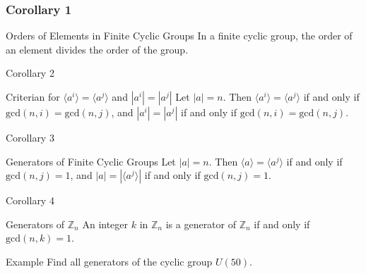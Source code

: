 \documentclass{beamer}
\begin{document}
    \begin{frame}
        \frametitle{Corollary 1}
        \begin{block}{Orders of Elements in Finite Cyclic Groups}
        In a finite cyclic group, the order of an element divides the order of the group. 
        \end{block}
    \end{frame}

    \begin{frame}{Corollary 2}
    \begin{block}{Criterian for \(\langle a^i\rangle = \langle a^j \rangle\) and \(|a^i|=|a^j|\)}   
    Let \(|a|=n\). Then \(\langle a^i \rangle = \langle a^j \rangle\) if and only if \(\text{gcd}(n,i) =\text{gcd}(n,j)\), and \(|a^i|=|a^j|\) if and only if \(\text{gcd}(n,i)=\text{gcd}(n,j)\).
    \end{block}
    \end{frame}

    \begin{frame}{Corollary 3}
    \begin{block}{Generators of Finite Cyclic Groups}
    Let \(|a|=n\). Then \(\langle a\rangle = \langle a^j\rangle\) if and only if \(\text{gcd}(n,j)=1\), and \(|a|=|\langle a^j\rangle|\) if and only if \(\text{gcd}(n,j)=1\).
    \end{block}
    \end{frame}

    \begin{frame}{Corollary 4}
    \begin{block}{Generators of \(\mathbb{Z}_n\)} 
    An integer \(k\) in \(\mathbb{Z}_n\) is a generator of \(\mathbb{Z}_n\) if and only if \(\text{gcd}(n,k)=1\).
    \end{block}
    \end{frame}

    \begin{frame}{Example}
    Find all generators of the cyclic group \(U(50)\).
    \end{frame}
\end{document}
